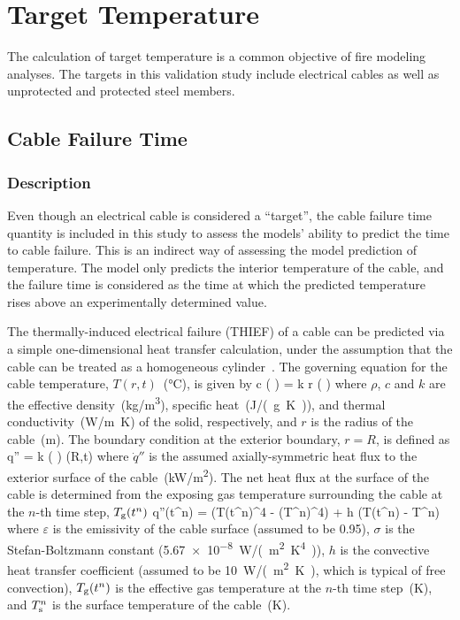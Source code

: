 
\chapter{Target Temperature}
\label{Target_Temperature_Chapter}

The calculation of target temperature is a common objective of fire modeling analyses. The targets in this validation study include electrical cables as well as unprotected and protected steel members.

\section{Cable Failure Time}
\label{sec:Cable_Failure_Time}

\subsection*{Description}

Even though an electrical cable is considered a ``target'', the cable failure time quantity is included in this study to assess the models' ability to predict the time to cable failure. This is an indirect way of assessing the model prediction of temperature. The model only predicts the interior temperature of the cable, and the failure time is considered as the time at which the predicted temperature rises above an experimentally determined value.

The thermally-induced electrical failure (THIEF) of a cable can be predicted via a simple one-dimensional heat transfer calculation, under the assumption that the cable can be treated as a homogeneous cylinder~\cite{CAROLFIRE}. The governing equation for the cable temperature,
$T(r,t)$~(\si{\celsius}), is given by
\be
\rho c \left(  \right) =   k r \left(  \right)
\label{eq:cable_temp}
\ee
where $\rho$, $c$ and $k$ are the effective density~(\si{kg/m^3}), specific heat~(\si{J/(g.K)}), and thermal conductivity~(\si{W/m.K}) of the solid, respectively, and $r$ is the radius of the cable~(\si{m}).
The boundary condition at the exterior boundary, $r = R$, is defined as
\be
\dot q'' = k \left(  \right) (R,t)
\ee
where $\dot q''$ is the assumed axially-symmetric heat flux to the exterior surface of the cable~(\si{kW/m^2}).
The net heat flux at the surface of the cable is determined from the exposing gas temperature surrounding the cable at the $n$-th time step, $T\sb{g}(t^n)$
\be
\dot q''(t^n) = \varepsilon \sigma (T(t^n)^4 - (T^n)^4) + h (T(t^n) - T^n)
\label{eq:cable_net_heat_flux}
\ee
where $\varepsilon$ is the emissivity of the cable surface (assumed to be 0.95), $\sigma$ is the Stefan-Boltzmann constant (\SI{5.67e-8}{W/(m^2.K^4)}), $h$ is the convective heat transfer coefficient (assumed to be \SI{10}{W/(m^2.K)}, which is typical of free convection), $T\sb{g}(t^n)$ is the effective gas temperature at the $n$-th time step~(\si{K}), and $T\sb{s}^n$ is the surface temperature of the cable~(\si{K}).


